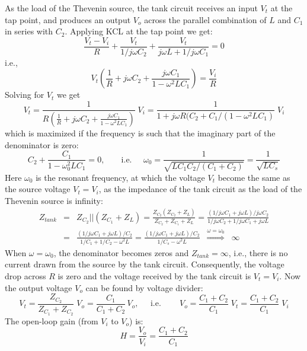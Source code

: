 \begin{itemize}

As the load of the Thevenin source, the tank circuit receives an input 
$V_t$ at the tap point, and produces an output $V_o$ across the parallel
combination of $L$ and $C_1$ in series with $C_2$. Applying KCL at the tap 
point we get:
\[
\frac{V_t-V_i}{R}+\frac{V_t}{1/j\omega C_2}+\frac{V_t}{j\omega L+1/j\omega C_1}=0
\]
i.e.,
\[
V_t\left(\frac{1}{R}+j\omega C_2+\frac{j\omega C_1}{1-\omega^2LC_1}\right)
=\frac{V_i}{R}
\]
Solving for $V_t$ we get
\[
V_t=\frac{1}{R(\frac{1}{R}+j\omega C_2+\frac{j\omega C_1}
{1-\omega^2LC_1})}\;V_i
=\frac{1}{1+j\omega R(C_2+C_1/(1-\omega^2LC_1)}\;V_i
\]
which is maximized if the frequency is such that the imaginary part of 
the denominator is zero:
\[
C_2+\frac{C_1}{1-\omega_0^2LC_1}=0,\;\;\;\;\;\;\;\mbox{i.e.}\;\;\;\;\;
\omega_0=\frac{1}{\sqrt{LC_1C_2/(C_1+C_2)}}=\frac{1}{\sqrt{LC_s}}
\]
Here $\omega_0$ is the resonant frequency, at which the voltage $V_t$ 
become the same as the source voltage $V_t=V_i$, as the impedance of
the tank circuit as the load of the Thevenin source is infinity:
\begin{eqnarray}
  Z_{tank}&=&Z_{C_2}||(Z_{C_1}+Z_L)=\frac{Z_{C_2}(Z_{C_2}+Z_L)}{Z_{C_2}+Z_{C_1}+Z_L}
  =\frac{(1/j\omega C_1+j\omega L)/j\omega C_2}
  {1/j\omega C_2+1/j\omega C_1+j\omega L}
  \nonumber\\
  &=&\frac{(1/j\omega C_1+j\omega L)/C_2}{1/C_1+1/C_2-\omega^2 L}
  =\frac{(1/j\omega C_1+j\omega L)/C_2}{1/C_s-\omega^2 L}
  \;\;\stackrel{\omega=\omega_0}{\Longrightarrow}\;\;\infty
  \nonumber
\end{eqnarray}
When $\omega=\omega_0$, the denominator becomes zeros and $Z_{tank}=\infty$,
i.e., there is no current drawn from the source by the tank circuit. 
Consequently, the voltage drop across $R$ is zero and the voltage received 
by the tank circuit is $V_t=V_i$. Now the output voltage $V_o$ can be found 
by voltage divider:
\[
V_t=\frac{Z_{C_2}}{Z_{C_1}+Z_{C_2}}\;V_o=\frac{C_1}{C_1+C_2}\,V_o,
\;\;\;\;\;\mbox{i.e.}\;\;\;\;\;\;\;\;
V_o=\frac{C_1+C_2}{C_1}\;V_t=\frac{C_1+C_2}{C_1}\;V_i
\]
The open-loop gain (from $V_i$ to $V_o$) is:
\[
H=\frac{V_o}{V_i}=\frac{C_1+C_2}{C_1}
\]

\begin{comment}
\begin{eqnarray}
  V_o&=&\frac{j\omega L}{j\omega L+1/j\omega C}\;V_t
  =\frac{\omega^2LC_1}{\omega^2LC_1-1}\;V_t
  \nonumber \\
  &=&\left(\frac{1-\omega^2LC_1}{1-\omega^2LC_1+j\omega R(C_1+C_2-\omega^2LC_1C_2)}\right)\;
  \left(\frac{\omega^2LC_1}{\omega^2LC_1-1}\right)\;V_i
  \nonumber \\
  &=&\frac{-\omega^2LC_1}{1-\omega^2LC_1+j\omega R(C_1+C_2-\omega^2LC_1C_2)}\;V_i
  \nonumber 
\end{eqnarray}


\end{comment}
\end{itemize}
